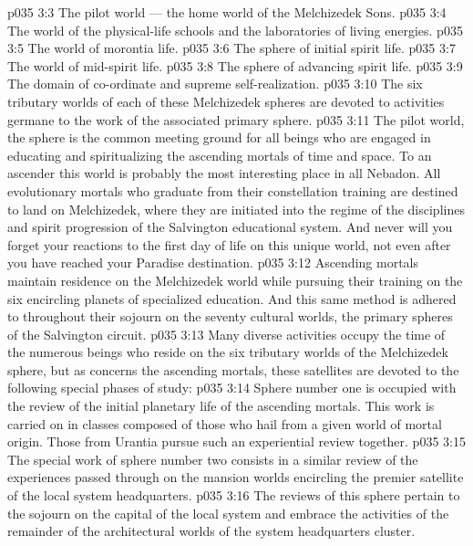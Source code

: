 \vs p035 3:3 \bibnobreakspace The pilot world --- the home world of the Melchizedek Sons.
\vs p035 3:4 \bibnobreakspace The world of the physical\hyp{}life schools and the laboratories of living energies.
\vs p035 3:5 \bibnobreakspace The world of morontia life.
\vs p035 3:6 \bibnobreakspace The sphere of initial spirit life.
\vs p035 3:7 \bibnobreakspace The world of mid\hyp{}spirit life.
\vs p035 3:8 \bibnobreakspace The sphere of advancing spirit life.
\vs p035 3:9 \bibnobreakspace The domain of co\hyp{}ordinate and supreme self\hyp{}realization.
\vs p035 3:10 \pc The six tributary worlds of each of these Melchizedek spheres are devoted to activities germane to the work of the associated primary sphere.
\vs p035 3:11 \pc The pilot world, the sphere  is the common meeting ground for all beings who are engaged in educating and spiritualizing the ascending mortals of time and space. To an ascender this world is probably the most interesting place in all Nebadon. All evolutionary mortals who graduate from their constellation training are destined to land on Melchizedek, where they are initiated into the regime of the disciplines and spirit progression of the Salvington educational system. And never will you forget your reactions to the first day of life on this unique world, not even after you have reached your Paradise destination.
\vs p035 3:12 Ascending mortals maintain residence on the Melchizedek world while pursuing their training on the six encircling planets of specialized education. And this same method is adhered to throughout their sojourn on the seventy cultural worlds, the primary spheres of the Salvington circuit.
\vs p035 3:13 \pc Many diverse activities occupy the time of the numerous beings who reside on the six tributary worlds of the Melchizedek sphere, but as concerns the ascending mortals, these satellites are devoted to the following special phases of study:
\vs p035 3:14 \pc {}\bibnobreakspace Sphere number one is occupied with the review of the initial planetary life of the ascending mortals. This work is carried on in classes composed of those who hail from a given world of mortal origin. Those from Urantia pursue such an experiential review together.
\vs p035 3:15 \pc {}\bibnobreakspace The special work of sphere number two consists in a similar review of the experiences passed through on the mansion worlds encircling the premier satellite of the local system headquarters.
\vs p035 3:16 \pc {}\bibnobreakspace The reviews of this sphere pertain to the sojourn on the capital of the local system and embrace the activities of the remainder of the architectural worlds of the system headquarters cluster.
